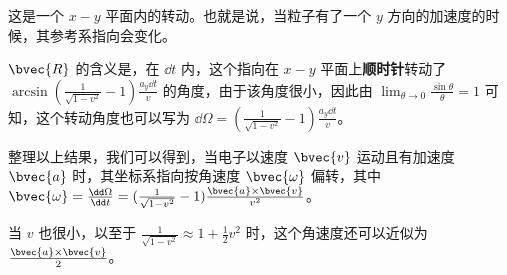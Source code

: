 这是一个 $x-y$ 平面内的转动。也就是说，当粒子有了一个 $y$ 方向的加速度的时候，其参考系指向会变化。

$\bvec{R}$ 的含义是，在 $\dd t$ 内，这个指向在 $x-y$ 平面上\textbf{顺时针}转动了 $\arcsin{(\frac{1}{\sqrt{1-v^2}}-1)\frac{a_y\dd t}{v}}$ 的角度，由于该角度很小，因此由 $\lim_{\theta\rightarrow 0}\frac{\sin\theta}{\theta}=1$ 可知，这个转动角度也可以写为 $\dd\Omega=(\frac{1}{\sqrt{1-v^2}}-1)\frac{a_y\dd t}{v}$。

整理以上结果，我们可以得到，当电子以速度 $\bvec{v}$ 运动且有加速度 $\bvec{a}$ 时，其坐标系指向按角速度 $\bvec{\omega}$ 偏转，其中 $\bvec{\omega}=\frac{\dd\Omega}{\dd t}=(\frac{1}{\sqrt{1-v^2}}-1)\frac{\bvec{a}\times\bvec{v}}{v^2}$。

当 $v$ 也很小，以至于 $\frac{1}{\sqrt{1-v^2}}\approx 1+\frac{1}{2}v^2$ 时，这个角速度还可以近似为 $\frac{\bvec{a}\times\bvec{v}}{2}$。








